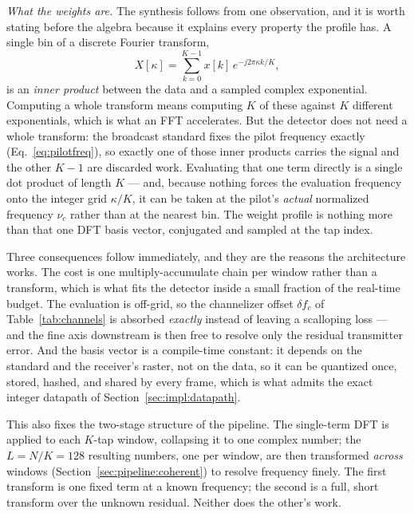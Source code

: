 \textit{What the weights are.} The synthesis follows from one observation, and it is worth stating before the algebra because it explains every property the profile has. A single bin of a discrete Fourier transform,
\begin{equation}
\label{eq:dftbin}
X[\kappa] = \sum_{k=0}^{K-1} x[k] \, e^{-j 2\pi \kappa k / K},
\end{equation}
is an \emph{inner product} between the data and a sampled complex exponential. Computing a whole transform means computing $K$ of these against $K$ different exponentials, which is what an FFT accelerates. But the detector does not need a whole transform: the broadcast standard fixes the pilot frequency exactly (Eq.~\eqref{eq:pilotfreq}), so exactly one of those inner products carries the signal and the other $K-1$ are discarded work. Evaluating that one term directly is a single dot product of length $K$ --- and, because nothing forces the evaluation frequency onto the integer grid $\kappa/K$, it can be taken at the pilot's \emph{actual} normalized frequency $\nu_c$ rather than at the nearest bin. The weight profile is nothing more than that one DFT basis vector, conjugated and sampled at the tap index.

Three consequences follow immediately, and they are the reasons the architecture works. The cost is one multiply-accumulate chain per window rather than a transform, which is what fits the detector inside a small fraction of the real-time budget. The evaluation is off-grid, so the channelizer offset $\delta\!f_c$ of Table~\ref{tab:channels} is absorbed \emph{exactly} instead of leaving a scalloping loss --- and the fine axis downstream is then free to resolve only the residual transmitter error. And the basis vector is a compile-time constant: it depends on the standard and the receiver's raster, not on the data, so it can be quantized once, stored, hashed, and shared by every frame, which is what admits the exact integer datapath of Section~\ref{sec:impl:datapath}.

This also fixes the two-stage structure of the pipeline. The single-term DFT is applied to each $K$-tap window, collapsing it to one complex number; the $L = N/K = 128$ resulting numbers, one per window, are then transformed \emph{across} windows (Section~\ref{sec:pipeline:coherent}) to resolve frequency finely. The first transform is one fixed term at a known frequency; the second is a full, short transform over the unknown residual. Neither does the other's work.

